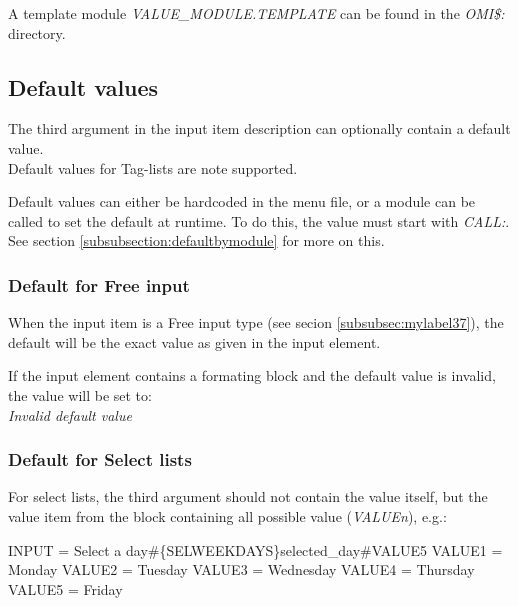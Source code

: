 \documentclass[a4paper]{book}
\newcommand{\vs}{\vspace{3mm}}
\renewcommand{\indent}{\hspace*{5mm}}
\begin{document}
\vs

A template module \textsl{VALUE{\_}MODULE.TEMPLATE} can be found in the \textsl{OMI{\$}:} directory.

\subsection{Default values}\label{subsubsec:defaults}

The third argument in the input item description can optionally contain a default value.\\
Default values for Tag-lists are note supported.

\vs

Default values can either be hardcoded in the menu file, or a module can be called to set the default at runtime.
To do this, the value must start with \textsl{CALL:}.\\
See section \ref{subsubsection:defaultbymodule} for more on this.

\subsubsection{Default for Free input}
When the input item is a Free input type (see secion \ref{subsubsec:mylabel37}), the default will be the exact
value as given in the input element.

If the input element contains a formating block and the default value is invalid, the value will be set to:\\
\textsl{Invalid default value}

\subsubsection{Default for Select lists}\label{subsubsection:defaultforselectlist}

For select lists, the third argument should not contain the value itself, but the value item from the block containing
all possible value (\textsl{VALUE\textit{n}}), e.g.:

\begin{ttfamily}
\indent INPUT = Select a day{\#}{\{}SEL\textbar WEEKDAYS{\}}selected{\_}day{\#}VALUE5\newline
\noindent[WEEKDAYS] \newline
\indent VALUE1 = Monday \newline
\indent VALUE2 = Tuesday \newline
\indent VALUE3 = Wednesday \newline
\indent VALUE4 = Thursday \newline
\indent VALUE5 = Friday \newline
\end{ttfamily}
\end{document}
